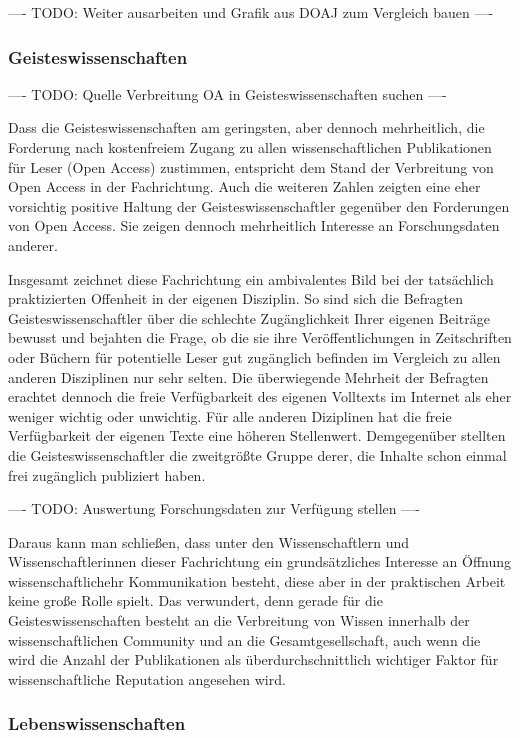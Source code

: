 ---- TODO: Weiter ausarbeiten und Grafik aus DOAJ zum Vergleich bauen  ----

\subsubsection{Geisteswissenschaften}

---- TODO: Quelle Verbreitung OA in Geisteswissenschaften suchen  ----

Dass die Geisteswissenschaften am geringsten, aber dennoch mehrheitlich, die Forderung nach kostenfreiem Zugang zu allen wissenschaftlichen Publikationen für Leser (Open Access) zustimmen, entspricht dem Stand der Verbreitung von Open Access in der Fachrichtung. Auch die weiteren Zahlen zeigten eine eher vorsichtig positive Haltung der Geisteswissenschaftler gegenüber den Forderungen von Open Access. Sie zeigen dennoch mehrheitlich Interesse an Forschungsdaten anderer.

Insgesamt zeichnet diese Fachrichtung ein ambivalentes Bild bei der tatsächlich praktizierten Offenheit in der eigenen Disziplin. So sind sich die Befragten Geisteswissenschaftler über die schlechte Zugänglichkeit Ihrer eigenen Beiträge bewusst und bejahten die Frage, ob die sie ihre Veröffentlichungen in Zeitschriften oder Büchern für potentielle Leser gut zugänglich befinden im Vergleich zu allen anderen Disziplinen nur sehr selten. Die überwiegende Mehrheit der Befragten erachtet dennoch die freie Verfügbarkeit des eigenen Volltexts im Internet als eher weniger wichtig oder unwichtig. Für alle anderen Diziplinen hat die freie Verfügbarkeit der eigenen Texte eine höheren Stellenwert. Demgegenüber stellten die Geisteswissenschaftler die zweitgrößte Gruppe derer, die Inhalte schon einmal frei zugänglich publiziert haben.

---- TODO: Auswertung Forschungsdaten zur Verfügung stellen  ----

Daraus kann man schließen, dass unter den Wissenschaftlern und Wissenschaftlerinnen dieser Fachrichtung ein grundsätzliches Interesse an Öffnung wissenschaftlichehr Kommunikation besteht, diese aber in der praktischen Arbeit keine große Rolle spielt. Das verwundert, denn gerade für die Geisteswissenschaften besteht an die Verbreitung von Wissen innerhalb der wissenschaftlichen Community und an die Gesamtgesellschaft, auch wenn die wird die Anzahl der Publikationen als überdurchschnittlich wichtiger Faktor für wissenschaftliche Reputation angesehen wird.

\subsubsection{Lebenswissenschaften}

